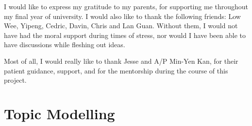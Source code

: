 \documentclass[hyp,12pt]{socreport}
\begin{document}
\begin{acknowledgement}
I would like to express my gratitude to my parents, for supporting me throughout 
my final year of university. I would also like to thank the following friends: 
Low Wee, Yipeng, Cedric, Davin, Chris and Lan Guan.  Without them, I would not 
have had the moral support during times of stress, nor would I have been able to 
have discussions while fleshing out ideas.

Most of all, I would really like to thank Jesse and A/P Min-Yen Kan, for their 
patient guidance, support, and for the mentorship during the course of this 
project.
\end{acknowledgement}

\listoffigures 
\listoftables
\tableofcontents 











\appendix
\chapter{Topic Modelling}\label{top_modeling}

\end{document}

